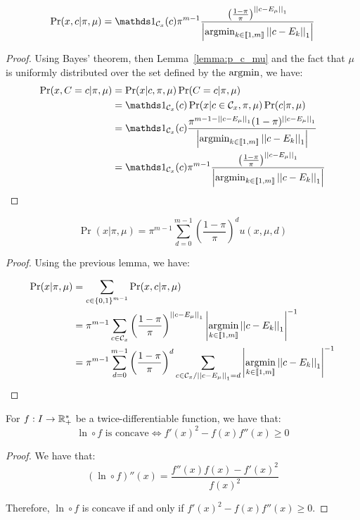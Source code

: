 \begin{lemma}
    \label{lemma:p_x_c_knowing_pi_mu_appendix}
    \[\Pr(x, c | \pi, \mu) = \indic{}_{\mathcal{C}_x}(c) \pi^{m-1}  \frac{\left(\frac{1 - \pi}{\pi}\right)^{\norm{c - E_{\mu}}_1}}{\card{\argmin_{k \in \bbrack{1, m}} \norm{c - E_k}_1}} \]
\end{lemma}
\begin{proof}
    Using Bayes' theorem, then Lemma~\ref{lemma:p_c_mu} and the fact that $\mu$ is uniformly distributed over the set defined by the $\operatorname*{argmin}$, we have:
    \begin{align}
        \Pr(x, C=c | \pi, \mu)
        &= \Pr(x | c, \pi, \mu) \Pr(C = c | \pi, \mu)\\
        &=  \indic{}_{\mathcal{C}_x}(c) \Pr(x | c \in \mathcal{C}_x, \pi, \mu) \Pr(c | \pi, \mu)\\
        &= \indic{}_{\mathcal{C}_x}(c) \frac{\pi^{m - 1 - \norm{c - E_{\mu}}_1} (1 - \pi)^{\norm{c - E_{\mu}}_1}}{\card{\argmin_{k \in \bbrack{1, m}} \norm{c - E_k}_1}}\\
        &= \indic{}_{\mathcal{C}_x}(c) \pi^{m-1}  \frac{\left(\frac{1 - \pi}{\pi}\right)^{\norm{c - E_{\mu}}_1}}{\card{\argmin_{k \in \bbrack{1, m}} \norm{c - E_k}_1}}
    \end{align}
\end{proof}


\begin{thm}
    \label{thm:p_x_knowing_pi_mu}
    \[\Pr(x | \pi, \mu) = \pi^{m-1} \sum_{d = 0}^{m-1} \left(\frac{1 - \pi}{\pi}\right)^d u(x, \mu, d)\]
\end{thm}
\begin{proof}
Using the previous lemma, we have:

\begin{align}
    \Pr(x | \pi, \mu)
    &= \sum_{c \in \left\{ 0, 1 \right\}^{m-1}} \Pr(x, c | \pi, \mu)\\
    &= \pi^{m-1} \sum_{c \in \mathcal{C}_x} \left(\frac{1 - \pi}{\pi}\right)^{\left|\left|c - E_{\mu}\right|\right|_1} \left|\operatorname*{argmin}_{k \in \left\llbracket1, m\right\rrbracket} \left|\left|c - E_k\right|\right|_1\right|^{-1}\\
    &= \pi^{m-1} \sum_{d = 0}^{m-1} \left(\frac{1 - \pi}{\pi}\right)^d \sum_{c \in \mathcal{C}_x / \left|\left|c - E_{\mu}\right|\right|_1 = d}  \left|\operatorname*{argmin}_{k \in \left\llbracket1, m\right\rrbracket} \left|\left|c - E_k\right|\right|_1\right|^{-1}
\end{align}
\end{proof}

\begin{lemma}
    \label{lemma:concavity_log_composed_functions}
    For $f: I \rightarrow \mathbb{R}_+^*$ be a twice-differentiable function, we have that:
    \[ \ln \circ f \text{ is concave} \iff f'(x)^2 - f(x) f''(x) \geq 0 \]
\end{lemma}
\begin{proof}
    We have that:
    \[ (\ln \circ f)''(x) = \frac{f''(x)f(x) - f'(x)^2}{f(x)^2} \]
    
    Therefore, $\ln \circ f$ is concave if and only if $f'(x)^2 - f(x) f''(x) \geq 0$.
\end{proof}


